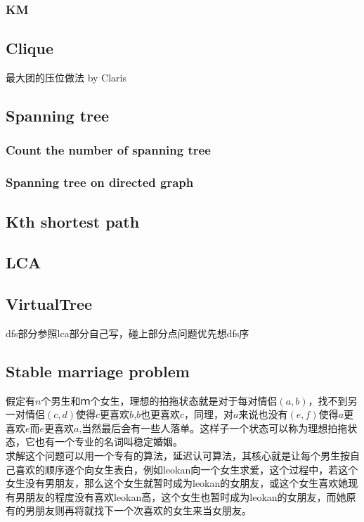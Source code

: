 \subsubsection{KM}


\subsection{Clique}


最大团的压位做法 by Claris \\



\subsection{Spanning tree}
\subsubsection{Count the number of spanning tree}

\subsubsection{Spanning tree on directed graph}


\subsection{Kth shortest path}

\subsection{LCA}

\subsection{VirtualTree}
dfs部分参照lca部分自己写，碰上部分点问题优先想dfs序

\subsection{Stable marriage problem}
	假定有$n$个男生和$ｍ$个女生，理想的拍拖状态就是对于每对情侣$(a,b)$，找不到另一对情侣$(c,d)$使得$c$更喜欢$b$,$b$也更喜欢$c$，同理，对$a$来说也没有$(e,f)$使得$a$更喜欢$e$而$e$更喜欢$a$,当然最后会有一些人落单。这样子一个状态可以称为理想拍拖状态，它也有一个专业的名词叫稳定婚姻。\\
	求解这个问题可以用一个专有的算法，延迟认可算法，其核心就是让每个男生按自己喜欢的顺序逐个向女生表白，例如leokan向一个女生求爱，这个过程中，若这个女生没有男朋友，那么这个女生就暂时成为leokan的女朋友，或这个女生喜欢她现有男朋友的程度没有喜欢leokan高，这个女生也暂时成为leokan的女朋友，而她原有的男朋友则再将就找下一个次喜欢的女生来当女朋友。


